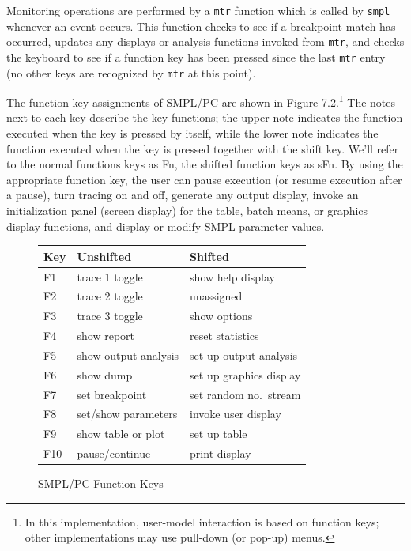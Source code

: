 Monitoring operations are performed by a \texttt{mtr} function which is called by
\texttt{smpl} whenever an event occurs. This function checks to see if a breakpoint
match has occurred, updates any displays or analysis functions invoked from
\texttt{mtr}, and checks the keyboard to see if a function key has been pressed since
the last \texttt{mtr} entry (no other keys are recognized by \texttt{mtr} at this point).

The function key assignments of SMPL/PC are shown in Figure 7.2.\footnote{In this implementation, user-model interaction is based on function keys; other implementations may use pull-down (or pop-up) menus.}
The notes next to each key describe the key functions; the upper note indicates
the function executed when the key is pressed by itself, while the lower note
indicates the function executed when the key is pressed together with the
shift key. We'll refer to the normal functions keys as Fn, the shifted function
keys as sFn. By using the appropriate function key, the user can pause
execution (or resume execution after a pause), turn tracing on and off, generate
any output display, invoke an initialization panel (screen display) for the
table, batch means, or graphics display functions, and display or modify
SMPL parameter values.

\begin{figure}[htbp]
\centering
\begin{tabular}{lll}
\hline
Key & Unshifted & Shifted \\
\hline
F1 & trace 1 toggle & show help display \\
F2 & trace 2 toggle & unassigned \\
F3 & trace 3 toggle & show options \\
F4 & show report & reset statistics \\
F5 & show output analysis & set up output analysis \\
F6 & show dump & set up graphics display \\
F7 & set breakpoint & set random no.\ stream \\
F8 & set/show parameters & invoke user display \\
F9 & show table or plot & set up table \\
F10 & pause/continue & print display \\
\hline
\end{tabular}
\caption{SMPL/PC Function Keys}
\label{fig:smpl-function-keys}
\end{figure}

